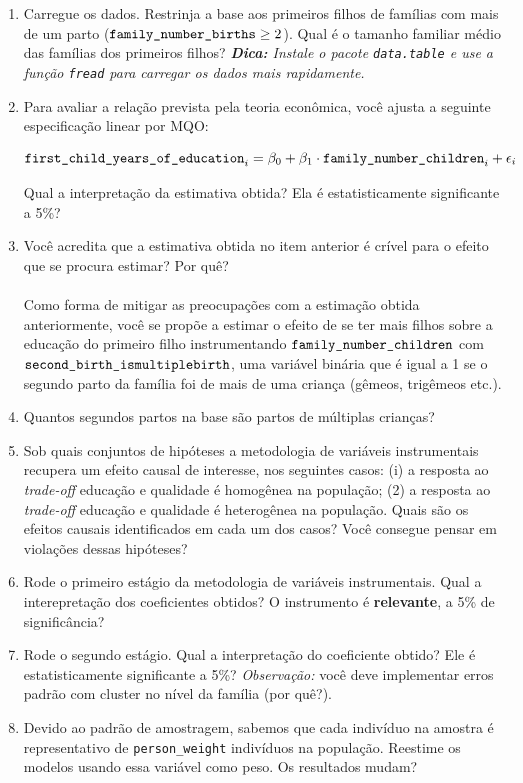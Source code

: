 \documentclass[10pt,a4paper]{article}
\begin{document}
\begin{enumerate}[label=\roman*]
	\item Carregue os dados. Restrinja a base aos primeiros filhos de famílias com mais de um parto ($\text{\texttt{family\_number\_births}}\geq 2$). Qual é o tamanho familiar médio das famílias dos primeiros filhos? \textit{\textbf{Dica:} Instale o pacote \texttt{data.table} e use a função \texttt{fread} para carregar os dados mais rapidamente.}
	\item Para avaliar a relação prevista pela teoria econômica, você ajusta a seguinte especificação linear por MQO:
	
	\begin{equation*}
		\text{\texttt{first\_child\_years\_of\_education}}_i = \beta_0 + \beta_1 \cdot 	\text{\texttt{family\_number\_children}}_i+\epsilon_i
	\end{equation*}
	
	 Qual a interpretação da estimativa obtida? Ela é estatisticamente significante a 5\%? 
	
	\item Você acredita que a estimativa obtida no item anterior é crível para o efeito que se procura estimar? Por quê? \\ \\
	Como forma de mitigar as preocupações com a estimação obtida anteriormente, você se propõe a estimar o efeito de se ter mais filhos sobre a educação do primeiro filho instrumentando  $	\text{\texttt{family\_number\_children}}$ com $\text{\texttt{second\_birth\_ismultiplebirth}}$, uma variável binária que é igual a 1 se o segundo parto da família foi de mais de uma criança (gêmeos, trigêmeos etc.).
	
	\item Quantos segundos partos na base são partos de múltiplas crianças?
	
	\item Sob quais conjuntos de hipóteses a metodologia de variáveis instrumentais recupera um efeito causal de interesse, nos seguintes casos: (i) a resposta ao \textit{trade-off} educação e qualidade é homogênea na população; (2) a resposta ao \textit{trade-off} educação e qualidade é heterogênea na população. Quais são os efeitos causais identificados em cada um dos casos? Você consegue pensar em violações dessas hipóteses?
	
	\item Rode o primeiro estágio da metodologia de variáveis instrumentais. Qual a interepretação dos coeficientes obtidos? O instrumento é \textbf{relevante}, a 5\% de significância?
	
	\item Rode o segundo estágio. Qual a interpretação do coeficiente obtido? Ele é estatisticamente significante a 5\%? \textit{Observação:} você deve implementar erros padrão com cluster no nível da família (por quê?).
	
\item Devido ao padrão de amostragem, sabemos que cada indivíduo na amostra é representativo de \texttt{person\_weight} indivíduos na população. Reestime os modelos usando essa variável como peso. Os resultados mudam?
\end{enumerate}

\printbibliography
\end{document}
